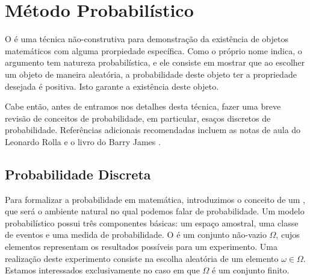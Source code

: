 
\chapter{Método Probabilístico}
\label{chap:prob}


O  é uma técnica não-construtiva para demonstração da existência de objetos matemáticos com alguma prorpiedade específica. Como o próprio nome indica, o argumento tem natureza probabilística, e ele consiste em mostrar que ao escolher um objeto de maneira aleatória, a probabilidade deste objeto ter a propriedade desejada é positiva. Isto garante a existência deste objeto.

Cabe então, antes de entramos nos detalhes desta técnica, fazer uma breve revisão de conceitos de probabilidade, em particular, esaços discretos de probabilidade. Referências adicionais recomendadas incluem as notas de aula do Leonardo Rolla \cite{rolla} e o livro do Barry James \cite{barryjames}.


\section{Probabilidade Discreta}

Para formalizar a probabilidade em matemática, introduzimos o conceito de um , que será o ambiente natural no qual podemos falar de probabilidade.
Um modelo probabilístico possui três componentes básicas: um espaço amostral, uma classe de eventos e uma medida de probabilidade. O  é um conjunto não-vazio $\Omega$, cujos elementos representam os resultados possíveis para um experimento. Uma realização deste experimento consiste na escolha aleatória de um elemento $\omega \in \Omega$. Estamos interessados exclusivamente no caso em que $\Omega$ é um conjunto finito.


